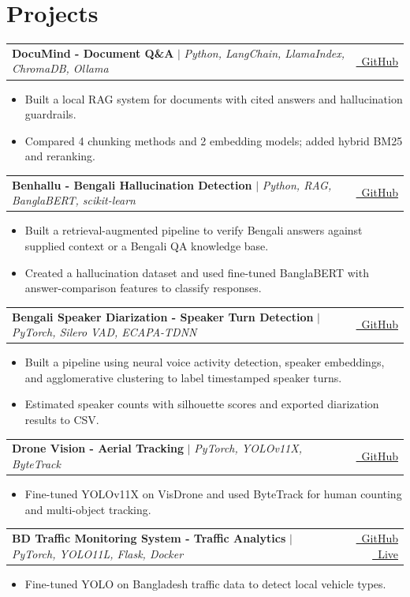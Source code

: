\documentclass{resume}
\makeatletter
\newcommand{\projectheading}[4]{%
  \Needspace{3\baselineskip}%
  \begin{tabularx}{\linewidth}{@{}X@{\hspace{1em}}r@{}}
    \textbf{#1 - #2} $|$ \emph{#3} & {\small #4}
  \end{tabularx}\vspace{-4pt}
}
\renewenvironment{rSection}[1]{
  \Needspace{3\baselineskip}%
  \section{#1}
  \begin{list}{}{
      \setlength{\leftmargin}{0.2em}
  }
  \item[]
}{
  \end{list}
  \vspace{0pt}
}
\makeatother
\begin{document}
\begin{rSection}{Projects}

\projectheading{DocuMind}{Document Q\&A}{Python, LangChain, LlamaIndex, ChromaDB, Ollama}{%
  \href{https://github.com/shufanshahi/DocuMind}{\faGithub\ GitHub}%
}
\begin{itemize}
  \item Built a local RAG system for documents with cited answers and hallucination guardrails.
  \item Compared 4 chunking methods and 2 embedding models; added hybrid BM25 and reranking.
\end{itemize}

\projectheading{Benhallu}{Bengali Hallucination Detection}{Python, RAG, BanglaBERT, scikit-learn}{%
  \href{https://github.com/shufanshahi/Benhallu}{\faGithub\ GitHub}%
}
\begin{itemize}
  \item Built a retrieval-augmented pipeline to verify Bengali answers against supplied context or a Bengali QA knowledge base.
  \item Created a hallucination dataset and used fine-tuned BanglaBERT with answer-comparison features to classify responses.
\end{itemize}

\projectheading{Bengali Speaker Diarization}{Speaker Turn Detection}{PyTorch, Silero VAD, ECAPA-TDNN}{%
  \href{https://github.com/shufanshahi/Bengali-Speaker-Diarization}{\faGithub\ GitHub}%
}
\begin{itemize}
  \item Built a pipeline using neural voice activity detection, speaker embeddings, and agglomerative clustering to label timestamped speaker turns.
  \item Estimated speaker counts with silhouette scores and exported diarization results to CSV.
\end{itemize}

\projectheading{Drone Vision}{Aerial Tracking}{PyTorch, YOLOv11X, ByteTrack}{%
  \href{https://github.com/shufanshahi/droneVision}{\faGithub\ GitHub}%
}
\begin{itemize}
  \item Fine-tuned YOLOv11X on VisDrone and used ByteTrack for human counting and multi-object tracking.
\end{itemize}

\projectheading{BD Traffic Monitoring System}{Traffic Analytics}{PyTorch, YOLO11L, Flask, Docker}{%
  \href{https://github.com/shufanshahi/bd-traffic-monitoring-system}{\faGithub\ GitHub}
  \quad
  \href{https://huggingface.co/spaces/shufanshahi/bd-traffic-monitoring-system}{\faRocket\ Live}%
}
\begin{itemize}
  \item Fine-tuned YOLO on Bangladesh traffic data to detect local vehicle types.
\end{itemize}


\end{rSection}
\end{document}

